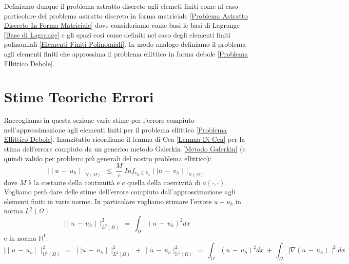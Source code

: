 \documentclass[12pt,a4paper]{report}
\theoremstyle{theorem}
\theoremstyle{theorem}
\theoremstyle{definition}
\begin{document}
Definiamo dunque il problema astratto discreto agli elemeti finiti come al caso particolare del problema astratto discreto in forma matriciale \ref{Problema Astratto Discreto In Forma Matriciale} dove consideriamo come basi le basi di Lagrange \ref{Base di Lagrange} e gli spazi cosi come definiti nel caso degli elementi finiti polinomiali \ref{Elementi Finiti Polinomiali}. In modo analogo definiamo il problema agli elementi finiti che approssima il problema ellittico in forma debole \ref{Problema Ellittico Debole}.

\section{Stime Teoriche Errori}
Raccogliamo in questa sezione varie stime per l'errore compiuto nell'approssimazione agli elementi finiti per il problema ellittico \ref{Problema Ellittico Debole}. Inanzitutto ricordiamo il lemma di Cea \ref{Lemma Di Cea} per la stima dell'errore compiuto da un generico metodo Galerkin \ref{Metodo Galerkin} (e quindi valido per problemi più generali del nostro problema ellittico):
\[ \mid \mid u \, - \, u_{h} \mid \mid_{\mathbb{V}(\Omega)} \ \leq \ \frac{M}{c} \ Inf_{v_{h} \in \mathbb{V}_{h}} \mid \mid u \, - \, v_{h} \mid \mid_{\mathbb{V}(\Omega)} \]
dove $M$ è la costante della continuità e $c$ quella della coercività di $a(\cdot,\cdot)$. Vogliamo però dare delle stime dell'errore compiuto dall'approssimazione agli elementi finiti in varie norme. In particolare vogliamo stimare l'errore $u - u_{h}$ in norma $L^{2}(\Omega)$
\[ \mid \mid u \, - \, u_{h} \mid \mid_{L^{2}(\Omega)}^{2} \ = \ \int_{\Omega} { (u \, - \, u_{h})^{2} dx}\]
e in norma $\mathbb{H}^{1}$:
\[ \mid \mid u \, - \, u_{h} \mid \mid_{\mathbb{H}^{1}(\Omega)}^{2} \ = \ \mid \mid u \, - \, u_{h} \mid \mid_{L^{2}(\Omega)}^{2} \ + \ \mid u \, - \, u_{h} \mid_{\mathbb{H}^{1}(\Omega)}^{2} \ = \ \int_{\Omega} { (u \, - \, u_{h})^{2} dx} \ + \ \int_{\Omega} { \mid \nabla(u \, - \, u_{h}) \mid^{2} dx}\]
\hfill \\
\end{document}
